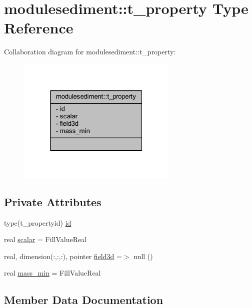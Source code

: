 \hypertarget{structmodulesediment_1_1t__property}{}\section{modulesediment\+:\+:t\+\_\+property Type Reference}
\label{structmodulesediment_1_1t__property}


Collaboration diagram for modulesediment\+:\+:t\+\_\+property\+:\nopagebreak
\begin{figure}[H]
\begin{center}
\leavevmode
\includegraphics[width=217pt]{structmodulesediment_1_1t__property__coll__graph}
\end{center}
\end{figure}
\subsection*{Private Attributes}
\begin{DoxyCompactItemize}
\item 
type(t\+\_\+propertyid) \mbox{\hyperlink{structmodulesediment_1_1t__property_a137ada320d3be2cd4ed2daab3d99d189}{id}}
\item 
real \mbox{\hyperlink{structmodulesediment_1_1t__property_a9a13733a997bcd1ad6f743d0e0a1e75e}{scalar}} = Fill\+Value\+Real
\item 
real, dimension(\+:,\+:,\+:), pointer \mbox{\hyperlink{structmodulesediment_1_1t__property_a14d4f55bf82e397b61a805bc674d92f3}{field3d}} =$>$ null ()
\item 
real \mbox{\hyperlink{structmodulesediment_1_1t__property_a82678223dfb47579b37affe7a793b06c}{mass\+\_\+min}} = Fill\+Value\+Real
\end{DoxyCompactItemize}


\subsection{Member Data Documentation}
\mbox{\label{structmodulesediment_1_1t__property_a14d4f55bf82e397b61a805bc674d92f3}} 

